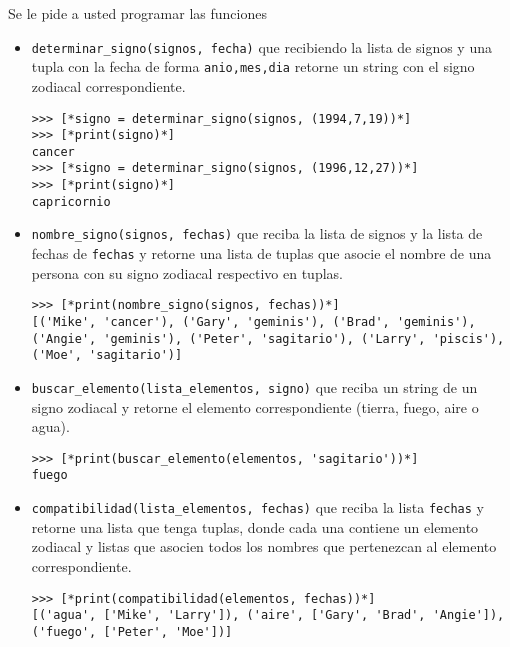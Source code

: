Se le pide a usted programar las funciones
\begin{itemize}
    \item \texttt{determinar\_signo(signos, fecha)} que recibiendo la lista de signos y una tupla con la fecha de forma \texttt{anio,mes,dia} retorne un string con el signo zodiacal correspondiente.
\begin{lstlisting}[style=consola]
>>> [*signo = determinar_signo(signos, (1994,7,19))*]
>>> [*print(signo)*]
cancer
>>> [*signo = determinar_signo(signos, (1996,12,27))*]
>>> [*print(signo)*]
capricornio

\end{lstlisting}
    \item \texttt{nombre\_signo(signos, fechas)} que reciba la lista de signos y la lista de fechas de \texttt{fechas} y retorne una lista de tuplas que asocie el nombre de una persona con su signo zodiacal respectivo en tuplas.
\begin{lstlisting}[style=consola]
>>> [*print(nombre_signo(signos, fechas))*]
[('Mike', 'cancer'), ('Gary', 'geminis'), ('Brad', 'geminis'), 
('Angie', 'geminis'), ('Peter', 'sagitario'), ('Larry', 'piscis'), 
('Moe', 'sagitario')]
\end{lstlisting}

    \item \texttt{buscar\_elemento(lista\_elementos, signo)} que reciba un string de un signo zodiacal y retorne el elemento correspondiente (tierra, fuego, aire o agua).
\begin{lstlisting}[style=consola]
>>> [*print(buscar_elemento(elementos, 'sagitario'))*]
fuego
\end{lstlisting}

    \item \texttt{compatibilidad(lista\_elementos, fechas)} que reciba la lista \texttt{fechas} y retorne una lista que tenga tuplas, donde cada una contiene un elemento zodiacal y listas que asocien todos los nombres que pertenezcan al elemento correspondiente.
\begin{lstlisting}[style=consola]
>>> [*print(compatibilidad(elementos, fechas))*]
[('agua', ['Mike', 'Larry']), ('aire', ['Gary', 'Brad', 'Angie']), 
('fuego', ['Peter', 'Moe'])]
\end{lstlisting}

\end{itemize}
